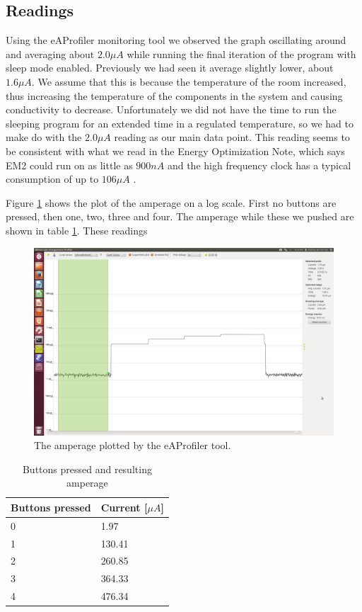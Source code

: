 \subsection{Readings}
Using the eAProfiler monitoring tool we observed the graph oscillating around and averaging about $2.0 \mu A$ while running the final iteration of the program with sleep mode enabled. Previously we had seen it average slightly lower, about $1.6 \mu A$. We assume that this is because the temperature of the room increased, thus increasing the temperature of the components in the system and causing conductivity to decrease. Unfortunately we did not have the time to run the sleeping program for an extended time in a regulated temperature, so we had to make do with the $2.0 \mu A$ reading as our main data point. This reading seems to be consistent with what we read in the Energy Optimization Note, which says EM2 could run on as little as $900 nA$ \cite[chapter 1]{energynote} and the high frequency clock has a typical consumption of up to $106 \mu A$ \cite[section 3.1]{energynote}.

Figure \ref{fig:ampsplot} shows the plot of the amperage on a log scale. First no buttons are pressed, then one, two, three and four. The amperage while these we pushed are shown in table \ref{tbl:current}. These readings 

\begin{figure}[h!]
    \includegraphics[width=\linewidth]{img/0.png}
    \caption{The amperage plotted by the eAProfiler tool.}
    \label{fig:ampsplot}
\end{figure}
\begin{table}[h!]
    \begin{tabular}{l|l}
        Buttons pressed & Current [$\mu A$] \\
	\hline
	0               & 1.97              \\
	1               & 130.41            \\
        2               & 260.85            \\
	3               & 364.33            \\
	4               & 476.34
    \end{tabular}
    \caption{Buttons pressed and resulting amperage \label{tbl:current}}
\end{table}

